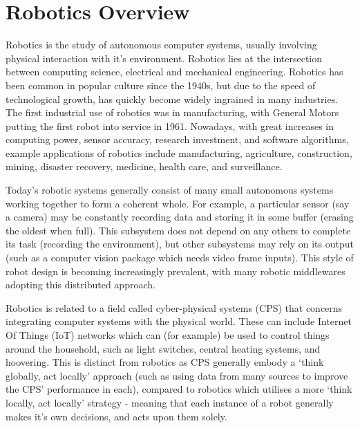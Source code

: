 \documentclass[../dissertation.tex]{subfiles}
\begin{document}
\section{Robotics Overview}
\label{background-robotics}

Robotics is the study of autonomous computer systems, usually involving physical interaction with it's environment. Robotics lies at the intersection between computing science, electrical and mechanical engineering. Robotics has been common in popular culture since the 1940s\cite{hockstein2007history}, but due to the speed of technological growth, has quickly become widely ingrained in many industries. The first industrial use of robotics was in manufacturing, with General Motors putting the first robot into service in 1961\cite{hagele2016ashorthistory}. Nowadays, with great increases in computing power, sensor accuracy, research investment, and software algorithms, example applications of robotics include manufacturing, agriculture, construction, mining, disaster recovery, medicine, health care, and surveillance\cite{hagele2016robotsatwork}.

Today's robotic systems generally consist of many small autonomous systems working together to form a coherent whole\cite{4058987}. For example, a particular sensor (say a camera) may be constantly recording data and storing it in some buffer (erasing the oldest when full). This subsystem does not depend on any others to complete its task (recording the environment), but other subsystems may rely on its output (such as a computer vision package which needs video frame inputs). This style of robot design is becoming increasingly prevalent, with many robotic middlewares adopting this distributed approach.

Robotics is related to a field called cyber-physical systems (CPS) that concerns integrating computer systems with the physical world\cite{Lee:EECS-2008-8}. These can include Internet Of Things (IoT) networks\cite{atzori2010internet} which can (for example) be used to control things around the household, such as light switches, central heating systems, and hoovering. This is distinct from robotics as CPS generally embody a `think globally, act locally' approach\cite{gordonthink} (such as using data from many sources to improve the CPS' performance in each), compared to robotics which utilises a more `think locally, act locally' strategy - meaning that each instance of a robot generally makes it's own decisions, and acts upon them solely.
\end{document}
